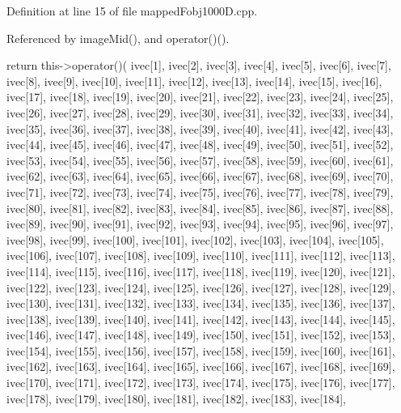 \-Definition at line 15 of file mapped\-Fobj1000\-D.\-cpp.



\-Referenced by image\-Mid(), and operator()().


\begin{DoxyCode}
{
  return this->operator()(
  ivec[1],
  ivec[2],
  ivec[3],
  ivec[4],
  ivec[5],
  ivec[6],
  ivec[7],
  ivec[8],
  ivec[9],
  ivec[10],
  ivec[11],
  ivec[12],
  ivec[13],
  ivec[14],
  ivec[15],
  ivec[16],
  ivec[17],
  ivec[18],
  ivec[19],
  ivec[20],
  ivec[21],
  ivec[22],
  ivec[23],
  ivec[24],
  ivec[25],
  ivec[26],
  ivec[27],
  ivec[28],
  ivec[29],
  ivec[30],
  ivec[31],
  ivec[32],
  ivec[33],
  ivec[34],
  ivec[35],
  ivec[36],
  ivec[37],
  ivec[38],
  ivec[39],
  ivec[40],
  ivec[41],
  ivec[42],
  ivec[43],
  ivec[44],
  ivec[45],
  ivec[46],
  ivec[47],
  ivec[48],
  ivec[49],
  ivec[50],
  ivec[51],
  ivec[52],
  ivec[53],
  ivec[54],
  ivec[55],
  ivec[56],
  ivec[57],
  ivec[58],
  ivec[59],
  ivec[60],
  ivec[61],
  ivec[62],
  ivec[63],
  ivec[64],
  ivec[65],
  ivec[66],
  ivec[67],
  ivec[68],
  ivec[69],
  ivec[70],
  ivec[71],
  ivec[72],
  ivec[73],
  ivec[74],
  ivec[75],
  ivec[76],
  ivec[77],
  ivec[78],
  ivec[79],
  ivec[80],
  ivec[81],
  ivec[82],
  ivec[83],
  ivec[84],
  ivec[85],
  ivec[86],
  ivec[87],
  ivec[88],
  ivec[89],
  ivec[90],
  ivec[91],
  ivec[92],
  ivec[93],
  ivec[94],
  ivec[95],
  ivec[96],
  ivec[97],
  ivec[98],
  ivec[99],
  ivec[100],
  ivec[101],
  ivec[102],
  ivec[103],
  ivec[104],
  ivec[105],
  ivec[106],
  ivec[107],
  ivec[108],
  ivec[109],
  ivec[110],
  ivec[111],
  ivec[112],
  ivec[113],
  ivec[114],
  ivec[115],
  ivec[116],
  ivec[117],
  ivec[118],
  ivec[119],
  ivec[120],
  ivec[121],
  ivec[122],
  ivec[123],
  ivec[124],
  ivec[125],
  ivec[126],
  ivec[127],
  ivec[128],
  ivec[129],
  ivec[130],
  ivec[131],
  ivec[132],
  ivec[133],
  ivec[134],
  ivec[135],
  ivec[136],
  ivec[137],
  ivec[138],
  ivec[139],
  ivec[140],
  ivec[141],
  ivec[142],
  ivec[143],
  ivec[144],
  ivec[145],
  ivec[146],
  ivec[147],
  ivec[148],
  ivec[149],
  ivec[150],
  ivec[151],
  ivec[152],
  ivec[153],
  ivec[154],
  ivec[155],
  ivec[156],
  ivec[157],
  ivec[158],
  ivec[159],
  ivec[160],
  ivec[161],
  ivec[162],
  ivec[163],
  ivec[164],
  ivec[165],
  ivec[166],
  ivec[167],
  ivec[168],
  ivec[169],
  ivec[170],
  ivec[171],
  ivec[172],
  ivec[173],
  ivec[174],
  ivec[175],
  ivec[176],
  ivec[177],
  ivec[178],
  ivec[179],
  ivec[180],
  ivec[181],
  ivec[182],
  ivec[183],
  ivec[184],
}
\end{DoxyCode}

